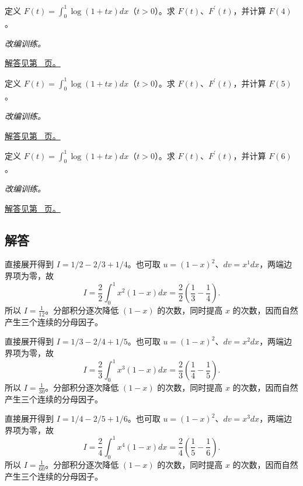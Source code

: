 \documentclass[UTF8,12pt,a4paper,fontset=fandol]{ctexart}
\begin{document}
\begin{example}[简单含参积分的求导]\label{ex:c20q22}
定义 $F(t)=\int_0^1\log(1+tx)dx$（$t>0$）。求 $F(t)$、$F^{\prime}(t)$，并计算 $F(4)$。
\par\textit{改编训练。}\par\hyperref[ans:c20q22]{解答见第~\pageref{ans:c20q22} 页。}
\end{example}
\begin{example}[简单含参积分的求导]\label{ex:c20q23}
定义 $F(t)=\int_0^1\log(1+tx)dx$（$t>0$）。求 $F(t)$、$F^{\prime}(t)$，并计算 $F(5)$。
\par\textit{改编训练。}\par\hyperref[ans:c20q23]{解答见第~\pageref{ans:c20q23} 页。}
\end{example}
\begin{example}[简单含参积分的求导]\label{ex:c20q24}
定义 $F(t)=\int_0^1\log(1+tx)dx$（$t>0$）。求 $F(t)$、$F^{\prime}(t)$，并计算 $F(6)$。
\par\textit{改编训练。}\par\hyperref[ans:c20q24]{解答见第~\pageref{ans:c20q24} 页。}
\end{example}
\subsection{解答}
\begin{solve}\label{ans:c20q1}
直接展开得到 $I=1/2-2/3+1/4$。也可取 $u=(1-x)^2$、$dv=x^{1}dx$，两端边界项为零，故
\[
I=\frac2{2}\int_0^1x^{2}(1-x)dx=\frac2{2}\left(\frac1{3}-\frac1{4}\right).
\]
所以 $I=\frac{1}{12}$。分部积分逐次降低 $(1-x)$ 的次数，同时提高 $x$ 的次数，因而自然产生三个连续的分母因子。
\end{solve}

\begin{solve}\label{ans:c20q2}
直接展开得到 $I=1/3-2/4+1/5$。也可取 $u=(1-x)^2$、$dv=x^{2}dx$，两端边界项为零，故
\[
I=\frac2{3}\int_0^1x^{3}(1-x)dx=\frac2{3}\left(\frac1{4}-\frac1{5}\right).
\]
所以 $I=\frac{1}{30}$。分部积分逐次降低 $(1-x)$ 的次数，同时提高 $x$ 的次数，因而自然产生三个连续的分母因子。
\end{solve}

\begin{solve}\label{ans:c20q3}
直接展开得到 $I=1/4-2/5+1/6$。也可取 $u=(1-x)^2$、$dv=x^{3}dx$，两端边界项为零，故
\[
I=\frac2{4}\int_0^1x^{4}(1-x)dx=\frac2{4}\left(\frac1{5}-\frac1{6}\right).
\]
所以 $I=\frac{1}{60}$。分部积分逐次降低 $(1-x)$ 的次数，同时提高 $x$ 的次数，因而自然产生三个连续的分母因子。
\end{solve}
\end{document}
